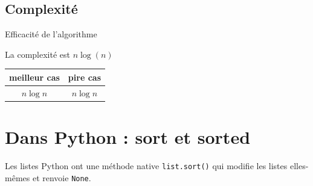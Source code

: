 \begin{exemple2}


\begin{center}
		
\end{center}


\end{exemple2}

%
%
\subsection{Complexité}
%
%
%
%
%
\begin{prop}{Efficacité de l'algorithme}

La complexité est \textbf{$n\log(n)$}

\begin{center}
\begin{tabular}{|c|c|}
\hline 
 meilleur cas &  pire cas \\ 
\hline 
$n \log n$ & $n \log n$ \\ 
\hline 
\end{tabular} 
\end{center}

\end{prop}



\section{Dans Python : sort et sorted}
Les listes Python ont une méthode native \texttt{list.sort()} qui modifie les listes elles-mêmes et renvoie \texttt{None}.

